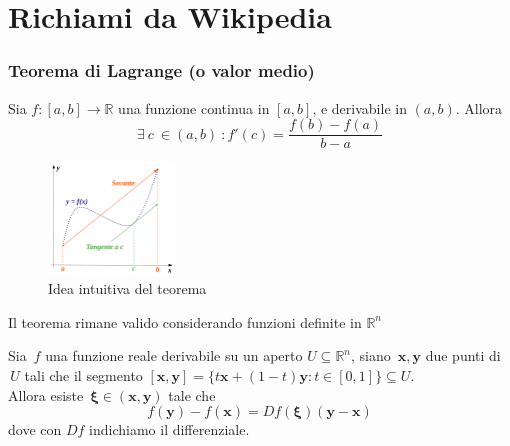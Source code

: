 

\inbpdocument 

\chapter{Richiami da Wikipedia}
\subsection{Teorema di Lagrange (o valor medio)} 
\begin{theo}
 \label{teo-valor-medio}
Sia $f: [a, b] \rightarrow \mathbb{R}$ una funzione continua in 
$[a, b]$, e derivabile in $(a, b)$. Allora
$$\exists \ c \ \in (a, b)\  : f'(c)=\frac{f(b)-f(a)}{b-a}$$
\end{theo}
\begin{figure}[h!]
 \centering
 \includegraphics[width=0.3\textwidth]{./imgs/teovalormedio.pdf}
 \caption{Idea intuitiva del teorema}
\end{figure}

Il teorema rimane valido considerando funzioni definite in $\mathbb{R}^n$

\begin{theo}
 \label{teo-valor-medio-rn}

Sia $\, f$ una funzione reale derivabile su un aperto $U \subseteq \mathbb{R}^n$,
 siano $\, \mathbf x, \mathbf y$ due punti di $\,U $ tali che il 
segmento $[\mathbf x, \mathbf y]=\{t \mathbf x + (1-t) \mathbf y : t \in [0,1]\} \subseteq U $.
\\
Allora esiste $\, \mathbf \xi \in (\mathbf x, \mathbf y)$ tale che
$$f(\mathbf y)-f(\mathbf x) = Df(\mathbf \xi)(\mathbf y -\mathbf x)$$
dove con $ Df $ indichiamo il differenziale. 
\end{theo}

